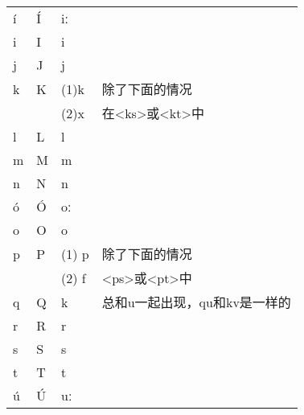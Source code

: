 \begin{table}[H]
\begin{tabular}{@{}llll@{}}
        í        & Í        & iː               &                                                              \\
        i        & I        & i                &                                                              \\
        j        & J        & j                &                                                              \\
        k        & K        & (1)k             & 除了下面的情况                                               \\
                 &          & (2)x             & 在\textless{}ks\textgreater{}或\textless{}kt\textgreater{}中 \\
        l        & L        & l                &                                                              \\
        m        & M        & m                &                                                              \\
        n        & N        & n                &                                                              \\
        ó        & Ó        & oː               &                                                              \\
        o        & O        & o                &                                                              \\
        p        & P        & (1) p            & 除了下面的情况                                               \\
                 &          & (2) f            & \textless{}ps\textgreater{}或\textless{}pt\textgreater{}中   \\
        q        & Q        & k                & 总和u一起出现，qu和kv是一样的                                \\
        r        & R        & r                &                                                              \\
        s        & S        & s                &                                                              \\
        t        & T        & t                &                                                              \\
        ú        & Ú        & uː               &                                                              \\

\end{tabular}
\end{table}
